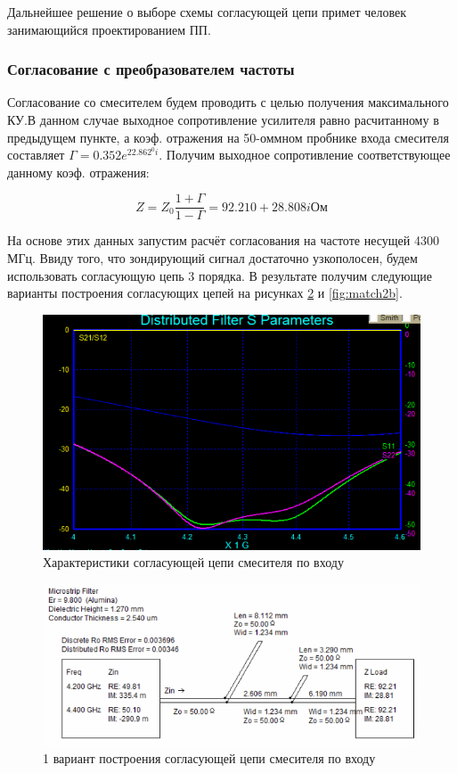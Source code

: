 \documentclass[utf8x, 14pt, oneside, a4paper]{article}
\begin{document}
				Дальнейшее решение о выборе схемы согласующей цепи примет человек занимающийся проектированием ПП.
			
			\subsubsection{Согласование с преобразователем частоты}
				Согласование со смесителем будем проводить с целью получения максимального КУ.В данном случае выходное сопротивление усилителя равно расчитанному в предыдущем пункте, а коэф. отражения на 50-оммном пробнике входа смесителя составляет $\Gamma=0.352e^{22.862^{0}i}$. Получим выходное сопротивление соответствующее данному коэф. отражения:
				
				\begin{equation}
					\label{eq:Gam_amp2}
					Z=Z_{0}\frac{1+\Gamma}{1-\Gamma}=92.210+28.808i \text{Ом}
				\end{equation}
			
				На основе этих данных запустим расчёт согласования на частоте несущей 4300 МГц. Ввиду того, что зондирующий сигнал достаточно узкополосен, будем использовать согласующую цепь 3 порядка. В результате получим следующие варианты построения согласующих цепей на рисунках \ref{fig:match2a} и \ref{fig:match2b}. 
				
				\begin{figure}[H]
					\centering
					\includegraphics[width=0.7\linewidth]{"Рисунки/Графики/Согласование со смесителем"}
					\caption{{Характеристики согласующей цепи смесителя по входу}}
					\label{fig:graf:match2}
				\end{figure}
				
				\begin{figure}[H]
					\centering
					\includegraphics[width=0.7\linewidth]{"Рисунки/Схемы/Согласование со смесителем А"}
					\caption{1 вариант построения согласующей цепи смесителя по входу}
					\label{fig:match2a}
				\end{figure}
				
\end{document}
